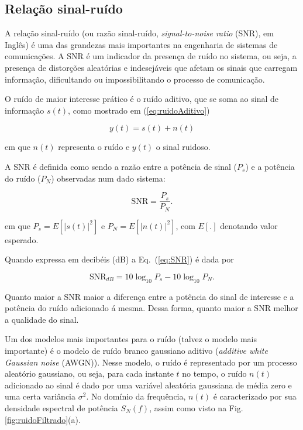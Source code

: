 \documentclass[12pt,addpoints]{exam}
\begin{document}
\subsection{Relação sinal-ruído} \label{sec:theorySNR}
A relação sinal-ruído (ou razão sinal-ruído, \textit{signal-to-noise ratio} (SNR), em Inglês) é uma das grandezas mais importantes na engenharia de sistemas de comunicações. A SNR é um indicador da presença de ruído no sistema, ou seja, a presença de distorções aleatórias e indesejáveis que afetam os sinais que carregam informação, dificultando ou impossibilitando o processo de comunicação. 

O ruído de maior interesse prático é o ruído aditivo, que se soma ao sinal de informação $s(t)$, como mostrado em (\ref{eq:ruidoAditivo})

\begin{equation}\label{eq:ruidoAditivo}
y(t) = s(t) + n(t)
\end{equation}

\noindent em que $n(t)$ representa o ruído e $y(t)$ o sinal ruidoso.

A SNR é definida como sendo a razão entre a potência de sinal ($P_s$) e a potência do ruído ($P_N$) observadas num dado sistema:

\begin{equation}\label{eq:SNR}
 \mathrm{SNR} = \frac{P_s}{P_N}.
\end{equation}

\noindent em que $P_s = E[|s(t)|^2]$ e $P_N=E[|n(t)|^2]$, com $E[.]$ denotando valor esperado.

Quando expressa em decibéis (dB) a Eq.~(\ref{eq:SNR}) é dada por

\begin{equation}\label{eq:SNRdB}
 \mathrm{SNR}_{dB} = 10\log_{10}P_s-10\log_{10}P_N.
\end{equation}

Quanto maior a SNR maior a diferença entre a potência do sinal de interesse e a potência do ruído adicionado á mesma. Dessa forma, quanto maior a SNR melhor a qualidade do sinal.

Um dos modelos mais importantes para o ruído (talvez o modelo mais importante) é o modelo de ruído branco gaussiano aditivo (\textit{additive white Gaussian noise} (AWGN)). Nesse modelo, o ruído é representado por um processo aleatório gaussiano, ou seja, para cada instante $t$ no tempo, o ruído $n(t)$ adicionado ao sinal é dado por uma variável aleatória gaussiana de média zero e uma certa variância $\sigma^2$. No domínio da frequência, $n(t)$ é caracterizado por sua densidade espectral de potência $S_N(f)$, assim como visto na Fig.\ref{fig:ruidoFiltrado}(a). 
\end{document}
